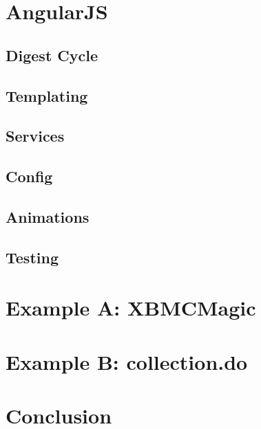 

\chapter{AngularJS}


\section{Digest Cycle}
\section{Templating}
\section{Services}
\section{Config}
\section{Animations}
\section{Testing}

\chapter{Example A: XBMCMagic}
\label{ch:xbmc}





\chapter{Example B: collection.do}
\label{ch:collection}






\chapter{Conclusion}

